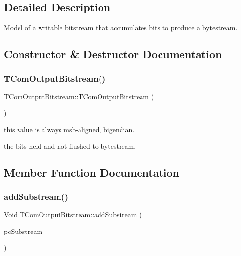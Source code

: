 \subsection{Detailed Description}
Model of a writable bitstream that accumulates bits to produce a bytestream. 

\subsection{Constructor \& Destructor Documentation}
\mbox{\label{class_t_com_output_bitstream_a9b96f12947371caf73bbc102c09fa3bc}} 
\subsubsection{\texorpdfstring{T\+Com\+Output\+Bitstream()}{TComOutputBitstream()}}
{\footnotesize\ttfamily T\+Com\+Output\+Bitstream\+::\+T\+Com\+Output\+Bitstream (\begin{DoxyParamCaption}{ }\end{DoxyParamCaption})}



this value is always msb-\/aligned, bigendian. 

the bits held and not flushed to bytestream. 

\subsection{Member Function Documentation}
\mbox{\label{class_t_com_output_bitstream_ad6e51419b95e94857b333cf1f5c997c9}} 
\subsubsection{\texorpdfstring{add\+Substream()}{addSubstream()}}
{\footnotesize\ttfamily Void T\+Com\+Output\+Bitstream\+::add\+Substream (\begin{DoxyParamCaption}\item[{\hyperlink{class_t_com_output_bitstream}{T\+Com\+Output\+Bitstream} $\ast$}]{pc\+Substream }\end{DoxyParamCaption})}


